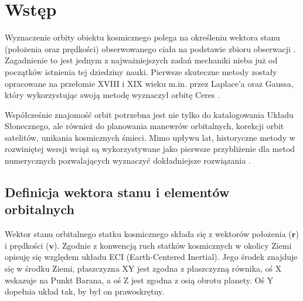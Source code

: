 \clearpage %
\section{Wstęp}
Wyznaczenie orbity obiektu kosmicznego polega na określeniu wektora stanu (położenia oraz prędkości) obserwowanego ciała na podstawie zbioru obserwacji \cite{FiftyYears}. Zagadnienie to jest jednym z najważniejszych zadań mechaniki nieba już od początków istnienia tej dziedziny nauki. Pierwsze skuteczne metody zostały opracowane na przełomie XVIII i XIX wieku m.in. przez Laplace'a \cite{Branham2005} oraz Gaussa, który wykorzystując swoją metodę wyznaczył orbitę Ceres \cite{Teets1999}.

Współcześnie znajomość orbit potrzebna jest nie tylko do katalogowania Układu Słonecznego, ale również do planowania manewrów orbitalnych, korekcji orbit satelitów, unikania kosmicznych śmieci. Mimo upływu lat, historyczne metody w rozwiniętej wersji wciąż są wykorzystywane jako pierwsze przybliżenie dla metod numerycznych pozwalających wyznaczyć dokładniejsze rozwiązania \cite{FiftyYears}.

\subsection{Definicja wektora stanu i elementów orbitalnych}
\label{ch:wektory-stanu}
\label{wektory}
Wektor stanu orbitalnego statku kosmicznego składa się z wektorów położenia ($\mathbf{r}$) i prędkości ($\mathbf{v}$). Zgodnie z konwencją ruch statków kosmicznych w okolicy Ziemi opisuję się względem układu ECI (Earth-Centered Inertial). Jego środek znajduje się w środku Ziemi, płaszczyzna XY jest zgodna z płaszczyzną równika, oś X wskazuje na Punkt Barana, a oś Z jest zgodna z osią obrotu planety. Oś Y dopełnia układ tak, by był on prawoskrętny.  

